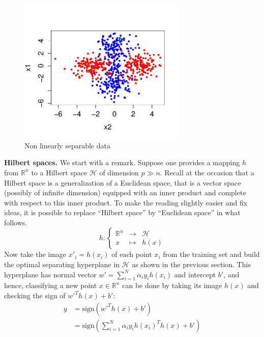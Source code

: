 \documentclass{article}
\begin{document}
\begin{figure}
\begin{center}
\includegraphics[width=8cm]{../img/datamix.pdf}
\end{center}
\caption{Non linearly separable data}
\label{fig:datamix}
\end{figure}

\textbf{Hilbert spaces.} We start with a remark. Suppose one provides a mapping $h$ from $\mathbb{R}^n$ to a Hilbert space $\mathcal{H}$ of dimension $p\gg n$. Recall at the occasion that a Hilbert space is a generalization of a Euclidean space, that is a vector space (possibly of infinite dimension) equipped with an inner product and complete with respect to this inner product. To make the reading slightly easier and fix ideas, it is possible to replace ``Hilbert space'' by ``Euclidean space'' in what follows.
\begin{equation*}
h:\left\{\begin{array}{ccc}\mathbb{R}^n &\rightarrow & \mathcal{H}\\x &\mapsto& h(x)\end{array}\right.
\end{equation*}
Now take the image $x'_i = h(x_i)$ of each point $x_i$ from the training set and build the optimal separating hyperplane in $\mathcal{H}$ as shown in the previous section. This hyperplane has normal vector $w'=\sum_{i=1}^N \alpha_i y_i h(x_i)$  and intercept $b'$, and hence, classifying a new point $x\in \mathbb{R}^n$ can be done by taking its image $h(x)$ and checking the sign of $w'^T h(x) + b'$:
\begin{align*}
y &= \text{sign}\left( w'^T h(x) + b' \right)\\
&= \text{sign}\left( \sum_{i=1}^N \alpha_i y_i h(x_i)^T h(x) + b' \right)
\end{align*}
\end{document}
